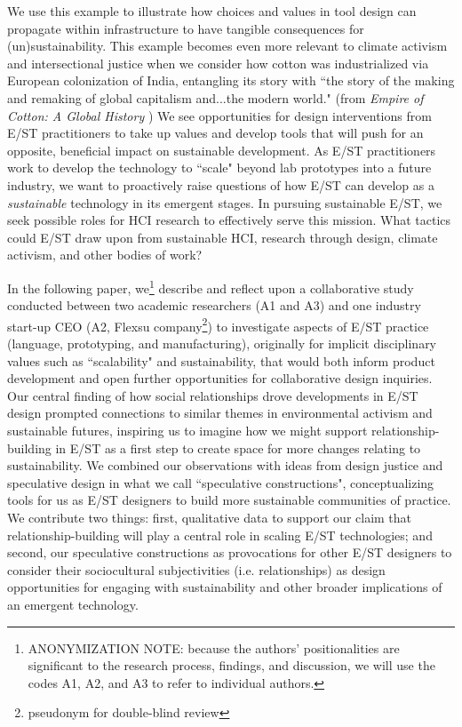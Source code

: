 \documentclass[manuscript,review,anonymous]{acmart}
\begin{document}
We use this example to illustrate how choices and values in tool design can propagate within infrastructure to have tangible consequences for (un)sustainability. This example becomes even more relevant to climate activism and intersectional justice when we consider how cotton was industrialized via European colonization of India, entangling its story with ``the story of the making and remaking of global capitalism and...the modern world." (from \textit{Empire of Cotton: A Global History} \cite{beckert_empire_2015}) We see opportunities for design interventions from E/ST practitioners to take up values and develop tools that will push for an opposite, beneficial impact on sustainable development.
As E/ST practitioners work to develop the technology to ``scale" beyond lab prototypes into a future industry, we want to proactively raise questions of how E/ST can develop as a \textit{sustainable} technology in its emergent stages. In pursuing sustainable E/ST, we seek possible roles for HCI research to effectively serve this mission. What tactics could E/ST draw upon from sustainable HCI, research through design, climate activism, and other bodies of work?

In the following paper, we\footnote{ANONYMIZATION NOTE: because the authors' positionalities are significant to the research process, findings, and discussion, we will use the codes A1, A2, and A3 to refer to individual authors.} 
describe and reflect upon a collaborative study conducted between two academic researchers (A1 and A3) and one industry start-up CEO (A2, Flexsu company\footnote{pseudonym for double-blind review}) to investigate aspects of E/ST practice (language, prototyping, and manufacturing), originally for implicit disciplinary values such as ``scalability" and sustainability, that would both inform product development and open further opportunities for collaborative design inquiries. Our central finding of how social relationships drove developments in E/ST design prompted connections to similar themes in environmental activism and sustainable futures, inspiring us to imagine how we might support relationship-building in E/ST as a first step to create space for more changes relating to sustainability. We combined our observations with ideas from design justice and speculative design in what we call ``speculative constructions", conceptualizing tools for us as E/ST designers to build more sustainable communities of practice. We contribute two things: first, qualitative data to support our claim that relationship-building will play a central role in scaling E/ST technologies; and second, our speculative constructions as provocations for other E/ST designers to consider their sociocultural subjectivities (i.e. relationships) as design opportunities for engaging with sustainability and other broader implications of an emergent technology.   
\end{document}
